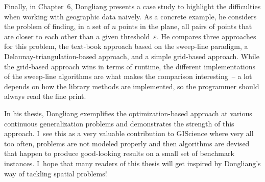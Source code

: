 {  Finally, in Chapter~6, Dongliang presents a case study to highlight
  the difficulties when working with geographic data naively.  As a
  concrete example, he considers the problem of finding, in a set of
  $n$ points in the plane, all pairs of points that are closer to each
  other than a given threshold~$\varepsilon$.  He compares three
  approaches for this problem, the text-book approach based on the
  sweep-line paradigm, a Delaunay-triangulation-based approach, and a
  simple grid-based approach.  While the grid-based approach wins in
  terms of runtime, the different implementations of the sweep-line
  algorithms are what makes the comparison interesting~-- a lot
  depends on how the library methods are implemented, so the
  programmer should always read the fine print.

  In his thesis, Dongliang exemplifies the optimization-based approach
  at various continuous generalization problems and demonstrates the
  strength of this approach.  I~see this as a very valuable
  contribution to GIScience where very all too often, problems are not
  modeled properly and then algorithms are devised that happen to
  produce good-looking results on a small set of benchmark instances.
  I~hope that many readers of this thesis will get inspired by
  Dongliang's way of tackling spatial problems!
	
}
